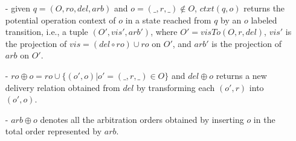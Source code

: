 \begin{itemize}
\begin {itemize}
    \item[-] %
      given $q = (O,\mathit{ro},\mathit{del},\mathit{arb})$ and $o=(\_,r,\_) \notin O$, ${\mathit{ctxt}}(q,o)$ returns the potential operation context of $o$ in a state reached from $q$ by an $o$ labeled transition, i.e., a tuple $(O',\mathit{vis}',\mathit{arb}')$, where $O' = \mathit{visTo}(O,r,\mathit{del})$, $\mathit{vis}'$ is the projection of $\mathit{vis}=(\mathit{del}\circ\mathit{ro})\cup\mathit{ro}$ on $O'$, and $\mathit{arb}'$ is the projection of $\mathit{arb}$ on $O'$.





    \item[-] $\mathit{ro} \oplus o = ro \cup \{ (o',o) \vert o' = (\_,r,\_) \in O \}$ and $\mathit{del} \oplus o$ returns a new delivery relation obtained from $del$ by transforming each $(o',r)$ into $(o',o)$.

    \item[-] $\mathit{arb}\oplus o$ denotes all the arbitration orders obtained by inserting $o$ in the total order represented by $\mathit{arb}$.


\end{itemize}
\end{itemize}
